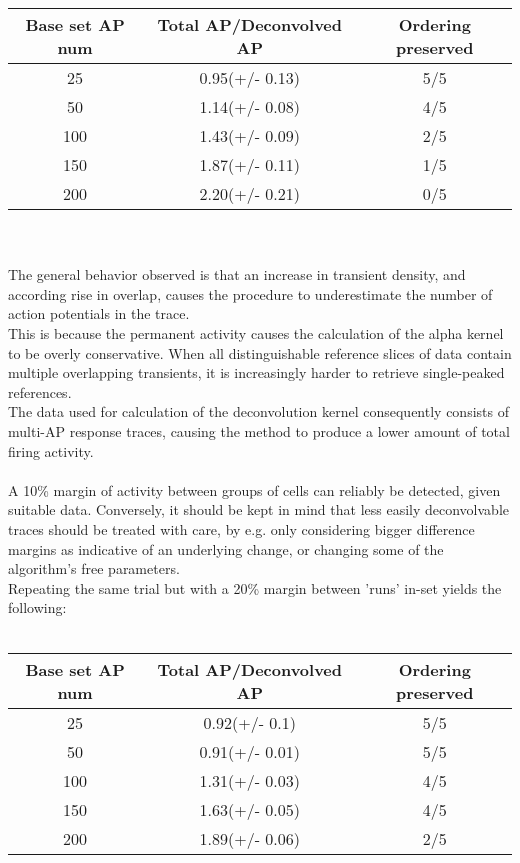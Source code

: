 \documentclass[titlepage]{article}
\begin{document}
\begin{tabular}{|c|c|c|}
\hline \rule[-2ex]{0pt}{5.5ex} Base set AP num & Total AP/Deconvolved AP&  Ordering preserved\\
\hline \rule[-2ex]{0pt}{5.5ex} 25 & 0.95(+/- 0.13) & 5/5 \\
\hline \rule[-2ex]{0pt}{5.5ex} 50 & 1.14(+/- 0.08) &  4/5 \\ 
\hline \rule[-2ex]{0pt}{5.5ex} 100 & 1.43(+/- 0.09) & 2/5 \\ 
\hline \rule[-2ex]{0pt}{5.5ex} 150 &  1.87(+/- 0.11) & 1/5 \\ 
\hline \rule[-2ex]{0pt}{5.5ex} 200 & 2.20(+/- 0.21) & 0/5 \\ 
\hline 
\end{tabular} \\\\
The general behavior observed is that an increase in transient density, and according rise in overlap, causes the procedure to underestimate the number of action potentials in the trace.\\
This is because the permanent activity causes the calculation of the alpha kernel to be overly conservative. When all distinguishable reference slices of data contain multiple overlapping transients, it is increasingly harder to retrieve single-peaked references.\\
The data used for calculation of the deconvolution kernel consequently consists of multi-AP response traces, causing the method to produce a lower amount of total firing activity.\\\\
A 10\% margin of activity between groups of cells can reliably be detected, given suitable data. Conversely, it should be kept in mind that less easily deconvolvable traces should be treated with care, by e.g. only considering bigger difference margins as indicative of an underlying change, or changing some of the algorithm's free parameters.\\
Repeating the same trial but with a 20\% margin between 'runs' in-set yields the following:\\\\
\begin{tabular}{|c|c|c|}
\hline \rule[-2ex]{0pt}{5.5ex} Base set AP num & Total AP/Deconvolved AP&  Ordering preserved\\
\hline \rule[-2ex]{0pt}{5.5ex} 25 & 0.92(+/- 0.1) & 5/5 \\
\hline \rule[-2ex]{0pt}{5.5ex} 50 & 0.91(+/- 0.01) &  5/5 \\ 
\hline \rule[-2ex]{0pt}{5.5ex} 100 & 1.31(+/- 0.03) & 4/5 \\ 
\hline \rule[-2ex]{0pt}{5.5ex} 150 &  1.63(+/- 0.05) & 4/5 \\ 
\hline \rule[-2ex]{0pt}{5.5ex} 200 & 1.89(+/- 0.06) & 2/5 \\ 
\hline 
\end{tabular}\\
\end{document}
